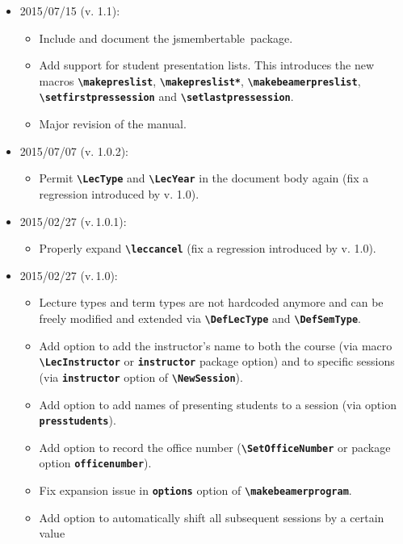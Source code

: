\documentclass[english]{article}
\newcommand*\jmacro[1]{\textbf{\texttt{#1}}}
\newcommand*\jcsmacro[1]{\jmacro{\textbackslash{#1}}}
\newcommand*\joption[1]{\textbf{\texttt{#1}}}
\newcommand*\jsmt{\textsf{jsmembertable}}
\begin{document}
\begin{itemize}
\item 2015/07/15 (v. 1.1):
     \begin{itemize}
       \item Include and document the \jsmt\ package.
       \item Add support for student presentation lists. This introduces the new macros
             \jcsmacro{makepreslist}, \jcsmacro{makepreslist*},
             \jcsmacro{makebeamerpreslist}, \jcsmacro{setfirstpressession} and
             \jcsmacro{setlastpressession}.
       \item Major revision of the manual.
     \end{itemize}
\item 2015/07/07 (v. 1.0.2):
     \begin{itemize}
       \item Permit \jcsmacro{LecType} and \jcsmacro{LecYear} in the document body again
             (fix a regression introduced by v. 1.0).
     \end{itemize}
\item 2015/02/27 (v.\,1.0.1):
     \begin{itemize}
       \item Properly expand \jcsmacro{leccancel}
             (fix a regression introduced by v. 1.0).
     \end{itemize}
\item 2015/02/27 (v.\,1.0):
     \begin{itemize}
       \item Lecture types and term types are not hardcoded anymore and can be freely
             modified and extended via \jcsmacro{DefLecType} and \jcsmacro{DefSemType}.
       \item Add option to add the instructor's name to both the course (via macro
             \jcsmacro{LecInstructor} or \joption{instructor} package option) and
             to specific sessions (via \joption{instructor} option of
             \jcsmacro{NewSession}).
       \item Add option to add names of presenting students to a session (via option
             \joption{presstudents}).
       \item Add option to record the office number (\jcsmacro{SetOfficeNumber}
             or package option \joption{officenumber}).
       \item Fix expansion issue in \joption{options} option of \jcsmacro{makebeamerprogram}.
       \item Add option to automatically shift all subsequent sessions by a certain value

\end{itemize}
\end{itemize}
\end{document}
